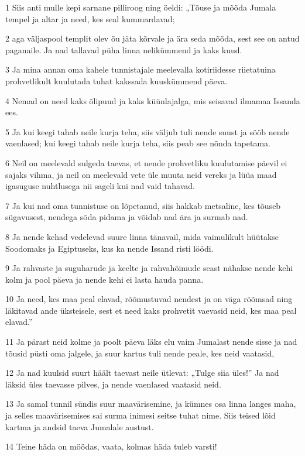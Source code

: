 \par 1 Siis anti mulle kepi sarnane pilliroog ning öeldi: „Tõuse ja mõõda Jumala tempel ja altar ja need, kes seal kummardavad;
\par 2 aga väljaspool templit olev õu jäta kõrvale ja ära seda mõõda, sest see on antud paganaile. Ja nad tallavad püha linna nelikümmend ja kaks kuud.
\par 3 Ja mina annan oma kahele tunnistajale meelevalla kotiriidesse riietatuina prohvetlikult kuulutada tuhat kakssada kuuskümmend päeva.
\par 4 Nemad on need kaks õlipuud ja kaks küünlajalga, mis seisavad ilmamaa Issanda ees.
\par 5 Ja kui keegi tahab neile kurja teha, siis väljub tuli nende suust ja sööb nende vaenlased; kui keegi tahab neile kurja teha, siis peab see nõnda tapetama.
\par 6 Neil on meelevald sulgeda taevas, et nende prohvetliku kuulutamise päevil ei sajaks vihma, ja neil on meelevald vete üle muuta neid vereks ja lüüa maad igasuguse nuhtlusega nii sageli kui nad vaid tahavad.
\par 7 Ja kui nad oma tunnistuse on lõpetanud, siis hakkab metsaline, kes tõuseb sügavusest, nendega sõda pidama ja võidab nad ära ja surmab nad.
\par 8 Ja nende kehad vedelevad suure linna tänavail, mida vaimulikult hüütakse Soodomaks ja Egiptuseks, kus ka nende Issand risti löödi.
\par 9 Ja rahvaste ja suguharude ja keelte ja rahvahõimude seast nähakse nende kehi kolm ja pool päeva ja nende kehi ei lasta hauda panna.
\par 10 Ja need, kes maa peal elavad, rõõmustuvad nendest ja on väga rõõmsad ning läkitavad ande üksteisele, sest et need kaks prohvetit vaevasid neid, kes maa peal elavad.”
\par 11 Ja pärast neid kolme ja poolt päeva läks elu vaim Jumalast nende sisse ja nad tõusid püsti oma jalgele, ja suur kartus tuli nende peale, kes neid vaatasid,
\par 12 Ja nad kuulsid suurt häält taevast neile ütlevat: „Tulge siia üles!” Ja nad läksid üles taevasse pilves, ja nende vaenlased vaatasid neid.
\par 13 Ja samal tunnil sündis suur maavärisemine, ja kümnes osa linna langes maha, ja selles maavärisemises sai surma inimesi seitse tuhat nime. Siis teised lõid kartma ja andsid taeva Jumalale austust.
\par 14 Teine häda on möödas, vaata, kolmas häda tuleb varsti!

